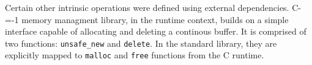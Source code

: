 Certain other intrinsic operations were defined using external dependencies.
C-=-1 memory managment library, in the runtime context, builds on a simple interface capable of allocating and deleting a continous buffer. %
It is comprised of two functions: \lstinline{unsafe_new} and \lstinline{delete}.
In the standard library, they are explicitly mapped to \lstinline{malloc} and \lstinline{free} functions from the C runtime.

